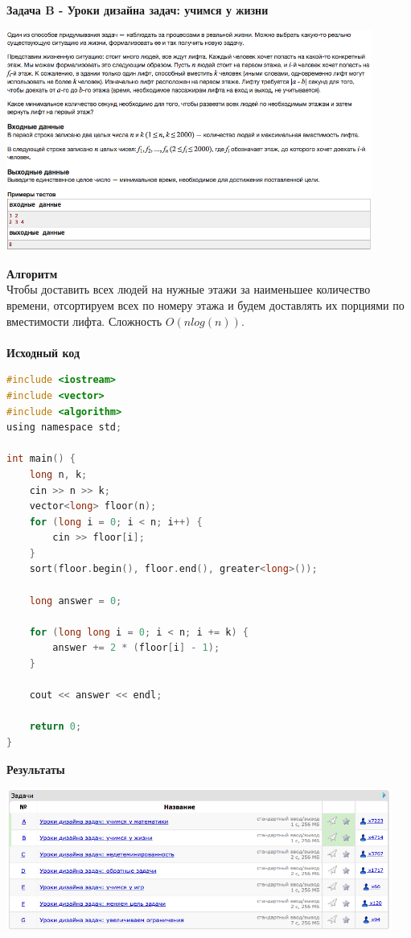 \documentclass[a4paper,12pt]{article}
\begin{document}
\newpage
\textbf{{\large Задача B - Уроки дизайна задач: учимся у жизни}} \\
\begin{center}
\includegraphics[width=0.9\textwidth]{C_270/C_270_B.png}\\ [1cm]
\end{center}
\textbf{{\large Алгоритм}} \\
Чтобы доставить всех людей на нужные этажи за наименьшее количество времени, отсортируем всех по номеру этажа и будем доставлять их порциями по вместимости лифта. Сложность $O(nlog(n))$.\\ 
\\
\textbf{{\large Исходный код}}
\begin{lstlisting}[language=C]
#include <iostream>
#include <vector>
#include <algorithm>
using namespace std;

int main() {
    long n, k;
    cin >> n >> k;    
    vector<long> floor(n);
    for (long i = 0; i < n; i++) {
        cin >> floor[i];
    }
    sort(floor.begin(), floor.end(), greater<long>());
    
    long answer = 0;
    
    for (long long i = 0; i < n; i += k) {
        answer += 2 * (floor[i] - 1);
    }
        
    cout << answer << endl;
    
    return 0;
}
\end{lstlisting}

\textbf{{\large Результаты}} \\
\begin{center}
\includegraphics[width=0.95\textwidth]{C_270/C_270_result.png}\\ [1cm]
\end{center}
\end{document}
